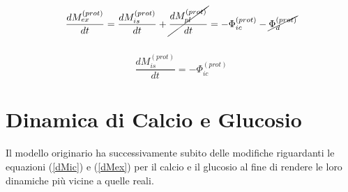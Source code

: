 \begin{equation*}
	\frac{dM_{ex}^{(prot)}}{dt} = \frac{dM_{is}^{(prot)}}{dt}+\cancel{\frac{dM_{pl}^{(prot)}}{dt}} = -\Phi_{ic}^{(prot)} -\cancel{\Phi_d^{(prot)}}\\
\end{equation*}
\\
\begin{equation}\label{dMisProt}
  \frac{dM_{is}^{(prot)}}{dt} = -\Phi_{ic}^{(prot)}
\end{equation}



\section{Dinamica di Calcio e Glucosio}
Il modello originario ha successivamente subito delle modifiche riguardanti le equazioni (\ref{dMic}) e (\ref{dMex}) per il calcio e il glucosio al fine di rendere le loro dinamiche più vicine a quelle reali.

